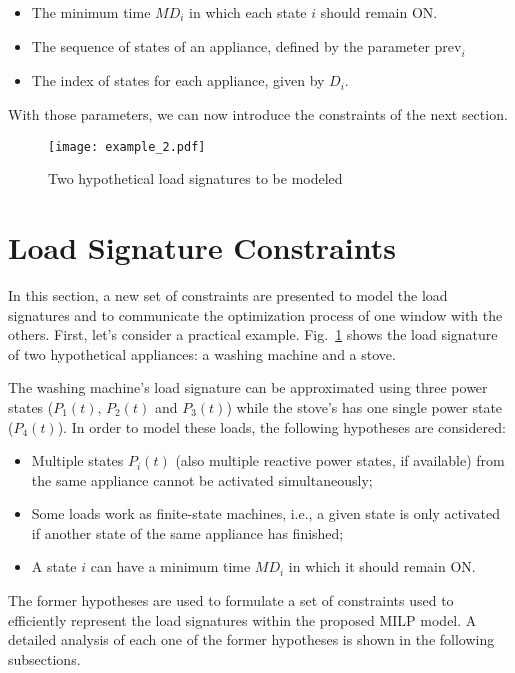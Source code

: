 \begin{itemize}
\item The minimum time $MD_i$ in which each state $i$ should remain ON.
\item The sequence of states of an appliance, defined by the parameter $\text{prev}_i$
\item The index of states for each appliance, given by $D_i$.
\end{itemize}

With those parameters, we can now introduce the constraints of the next section. 
\begin{figure}[htb]
    \centering
    \texttt{[image: example\_2.pdf]}
    \caption{Two hypothetical load signatures to be modeled}
    \label{example}
\end{figure}



\section{Load Signature Constraints}

In this section, a new set of constraints are presented to model the load signatures and to communicate the optimization process of one window with the others. First, let's consider a practical example. Fig.~\ref{example} shows the load signature of two hypothetical appliances: a washing machine and a stove.


The washing machine's load signature can be approximated using three power states ($P_1(t)$, $P_2(t)$ and $P_3(t)$) while the stove's has one single power state ($P_4(t)$). In order to model these loads, the following hypotheses are considered: 

\begin{itemize}

\item Multiple states $P_i(t)$ (also multiple reactive power states, if available) from the same appliance cannot be activated simultaneously;
\item Some loads work as finite-state machines, i.e., a given state is only activated if another state of the same appliance has finished;
\item A state $i$ can have a minimum time $MD_i$ in which it should remain ON.

\end{itemize}

The former hypotheses are used to formulate a set of constraints used to efficiently represent the load signatures within the proposed MILP model. A detailed analysis of each one of the former hypotheses is shown in the following subsections.

